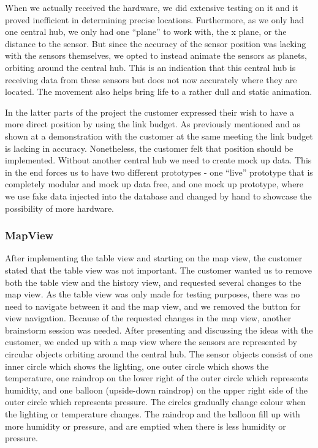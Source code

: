 \documentclass[../document.tex]{subfiles}
\begin{document}
When we actually received the hardware, we did extensive testing on it and it proved inefficient in determining precise locations. Furthermore, as we only had one central hub, we only had one “plane” to work with, the x plane, or the distance to the sensor. But since the accuracy of the sensor position was lacking with the sensors themselves, we opted to instead animate the sensors as planets, orbiting around the central hub. This is an indication that this central hub is receiving data from these sensors but does not now accurately where they are located. The movement also helps bring life to a rather dull and static animation.

In the latter parts of the project the customer expressed their wish to have a more direct position by using the link budget. As previously mentioned and as shown at a demonstration with the customer at the same meeting the link budget is lacking in accuracy. Nonetheless, the customer felt that position should be implemented. Without another central hub we need to create mock up data. This in the end forces us to have two different prototypes - one “live” prototype that is completely modular and mock up data free, and one mock up prototype, where we use fake data injected into the database and changed by hand to showcase the possibility of more hardware. 

\subsubsection{MapView}
After implementing the table view and starting on the map view, the customer stated that the table view was not important. The customer wanted us to remove both the table view and the history view, and requested several changes to the map view. As the table view was only made for testing purposes, there was no need to navigate between it and the map view, and we removed the button for view navigation. Because of the requested changes in the map view, another brainstorm session was needed. After presenting and discussing the ideas with the customer, we ended up with a map view where the sensors are represented by circular objects orbiting around the central hub. The sensor objects consist of one inner circle which shows the lighting, one outer circle which shows the temperature, one raindrop on the lower right of the outer circle which represents humidity, and one balloon (upside-down raindrop) on the upper right side of the outer circle which represents pressure. The circles gradually change colour when the lighting or temperature changes. The raindrop and the balloon fill up with more humidity or pressure, and are emptied when there is less humidity or pressure.
\end{document}
